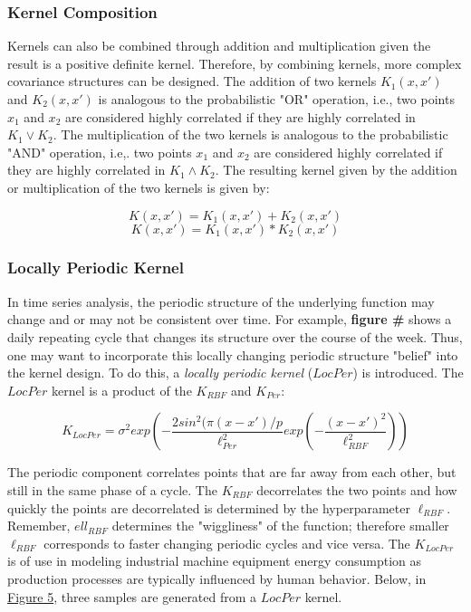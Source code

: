 \subsubsection{Kernel Composition}

Kernels can also be combined through addition and multiplication given the result is a positive definite kernel. Therefore, by combining kernels, more complex covariance structures can be designed. The addition of two kernels $K_1(x, x')$ and $K_2(x, x')$ is analogous to the probabilistic "OR" operation, i.e., two points $x_1$ and $x_2$ are considered highly correlated if they are highly correlated in $K_1 \lor K_2$. The multiplication of the two kernels is analogous to the probabilistic "AND" operation, i.e,. two points $x_1$ and $x_2$ are considered highly correlated if they are highly correlated in $K_1 \land K_2$. The resulting kernel given by the addition or multiplication of the two kernels is given by:

\begin{equation}
    K(x, x') = K_1(x, x') + K_2(x, x')
\end{equation}
\begin{equation}
    K(x, x') = K_1(x, x') * K_2(x, x')
\end{equation}

\subsubsection{Locally Periodic Kernel}

In time series analysis, the periodic structure of the underlying function may change and or may not be consistent over time. For example, \textbf{figure #} shows a daily repeating cycle that changes its structure over the course of the week. Thus, one may want to incorporate this locally changing periodic structure "belief" into the kernel design. To do this, a \textit{locally periodic kernel} ($LocPer$) is introduced. The $LocPer$ kernel is a product of the $K_{RBF}$ and $K_{Per}$:

\begin{equation}
    K_{LocPer} = \sigma^2 exp (-\frac{2sin^2(\pi(x - x') / p}{\ell_{Per}^2}exp(-\frac{(x - x')^2}{\ell_{RBF}^2}))
\end{equation}

The periodic component correlates points that are far away from each other, but still in the same phase of a cycle. The $K_{RBF}$ decorrelates the two points and how quickly the points are decorrelated is determined by the hyperparameter $\ell_{RBF}$. Remember, $ell_{RBF}$ determines the "wiggliness" of the function; therefore smaller $\ell_{RBF}$ corresponds to faster changing periodic cycles and vice versa. The $K_{LocPer}$ is of use in modeling industrial machine equipment energy consumption as production processes are typically influenced by human behavior. Below, in \hyperlink{figure.5}{Figure 5}, three samples are generated from a $LocPer$ kernel.

